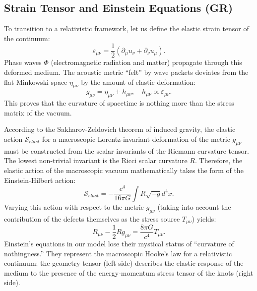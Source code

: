 \documentclass[12pt,a4paper]{article}
\begin{document}
\subsection{Strain Tensor and Einstein Equations (GR)}
To transition to a relativistic framework, let us define the elastic strain tensor of the continuum:
\begin{equation}
	\varepsilon_{\mu\nu} = \frac{1}{2} (\partial_\mu u_\nu + \partial_\nu u_\mu).
\end{equation}
Phase waves $\Phi$ (electromagnetic radiation and matter) propagate through this deformed medium. The acoustic metric ``felt'' by wave packets deviates from the flat Minkowski space $\eta_{\mu\nu}$ by the amount of elastic deformation:
\begin{equation}
	g_{\mu\nu} = \eta_{\mu\nu} + h_{\mu\nu}, \quad h_{\mu\nu} \propto \varepsilon_{\mu\nu}.
\end{equation}
This proves that the curvature of spacetime is nothing more than the stress matrix of the vacuum. 

According to the Sakharov-Zeldovich theorem of induced gravity, the elastic action $\mathcal{S}_{elast}$ for a macroscopic Lorentz-invariant deformation of the metric $g_{\mu\nu}$ must be constructed from the scalar invariants of the Riemann curvature tensor. The lowest non-trivial invariant is the Ricci scalar curvature $R$. Therefore, the elastic action of the macroscopic vacuum mathematically takes the form of the Einstein-Hilbert action:
\begin{equation}
	\mathcal{S}_{elast} = -\frac{c^4}{16\pi G} \int R \sqrt{-g} d^4x.
\end{equation}
Varying this action with respect to the metric $g_{\mu\nu}$ (taking into account the contribution of the defects themselves as the stress source $T_{\mu\nu}$) yields:
\begin{equation}
	R_{\mu\nu} - \frac{1}{2}R g_{\mu\nu} = \frac{8\pi G}{c^4} T_{\mu\nu}.
\end{equation}
Einstein's equations in our model lose their mystical status of ``curvature of nothingness.'' They represent the macroscopic Hooke's law for a relativistic continuum: the geometry tensor (left side) describes the elastic response of the medium to the presence of the energy-momentum stress tensor of the knots (right side).
\end{document}
